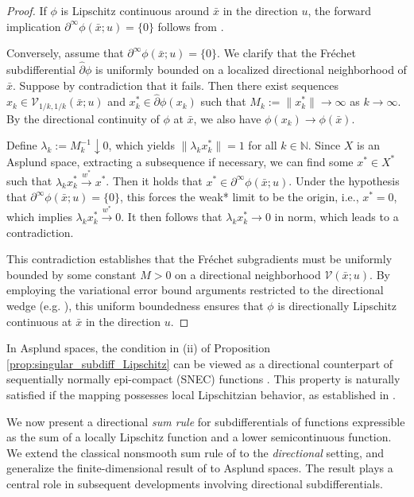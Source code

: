 \documentclass[12pt,twoside,reqno]{amsart}
\theoremstyle{definition}
\numberwithin{equation}{section}
\begin{document}
\begin{proof}
If $\phi$ is Lipschitz continuous around $\bar{x}$ in the direction $u$, the forward implication $\partial^{\infty} \phi(\bar{x}; u) = \{0\}$ follows from \cite[Corollary~5.9]{long2017calculus}.

Conversely, assume that $\partial^{\infty} \phi(\bar{x}; u) = \{0\}$. We clarify that the Fr\'echet subdifferential $\widehat{\partial} \phi$ is uniformly bounded on a localized directional neighborhood of $\bar{x}$. Suppose by contradiction that it fails. Then there exist sequences $x_k \in \mathcal{V}_{1/k, 1/k}(\bar{x};u)$ and $x_k^* \in \widehat{\partial} \phi(x_k)$ such that $M_k := \|x_k^*\| \to \infty$ as $k \to \infty$. 
By the directional continuity of $\phi$ at $\bar x$, we also have $\phi(x_k) \to \phi(\bar x)$. 

Define $\lambda_k := M_k^{-1} \downarrow 0$, which yields $\|\lambda_k x_k^*\| = 1$ for all $k \in \mathbb{N}$. Since $X$ is an Asplund space, extracting a subsequence if necessary, we can find some $x^* \in X^*$ such that $\lambda_k x_k^* \xrightarrow{w^*} x^*$. Then it holds that $x^* \in \partial^{\infty} \phi(\bar{x}; u)$. Under the hypothesis that $\partial^{\infty} \phi(\bar{x}; u) = \{0\}$, this forces the weak* limit to be the origin, i.e., $x^* = 0$, which implies $\lambda_k x_k^* \xrightarrow{w^*} 0$. It then follows that $\lambda_k x_k^* \to 0$ in norm, which leads to a contradiction. 

This contradiction establishes that the Fr\'echet subgradients must be uniformly bounded by some constant $M > 0$ on a directional neighborhood $\mathcal{V}(\bar{x}; u)$. By employing the variational error bound arguments restricted to the directional wedge (e.g. \cite[Theorem 3.52]{Mordukhovich2006variational}), this uniform boundedness ensures that $\phi$ is directionally Lipschitz continuous at $\bar{x}$ in the direction $u$. 
\end{proof}

In Asplund spaces, the condition in (ii) of Proposition \ref{prop:singular_subdiff_Lipschitz} can be viewed as a directional counterpart of sequentially normally epi-compact (SNEC) functions \cite[Definition 1.116, Corollary 2.39]{Mordukhovich2006variational}. This property is naturally satisfied if the mapping possesses local Lipschitzian behavior, as established in \cite[Theorem 1.26, Corollary 1.81]{Mordukhovich2006variational}. 

We now present a directional \emph{sum rule} for subdifferentials of functions expressible as the sum of a locally Lipschitz function and a lower semicontinuous function.  
We extend the classical nonsmooth sum rule of \cite[Theorem~2.33(c)]{Mordukhovich2006variational} to the \emph{directional} setting, and generalize the finite-dimensional result of \cite[Corollary~4.5]{benko2019calculus} to Asplund spaces.  
The result plays a central role in subsequent developments involving directional subdifferentials.
\end{document}

